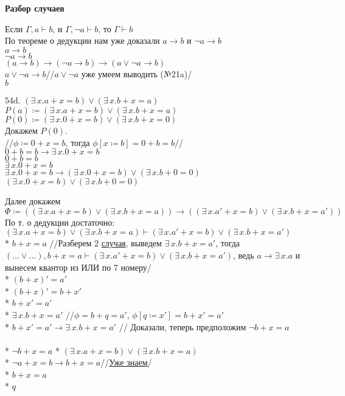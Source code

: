 \documentclass[12pt]{article}
\begin{document}
\hypertarget{cases}{{\bf Разбор случаев}}

Если $\Gamma,a\vdash b$, и $\Gamma,\neg a\vdash b$, то $\Gamma\vdash b$\\
По теореме о дедукции нам уже доказали $a\to b$ и $\neg a\to b$\\
$a\to b$\\
$\neg a\to b$\\
$(a\to b)\to(\neg a\to b)\to(a\vee\neg a\to b)$\\
$a\vee\neg a\to b$//$a\vee\neg a$ уже умеем выводить (№21a)/\\
$b$

54d. $(\exists\,x.a+x=b)\vee(\exists\,x.b+x=a)$\\
$P(a)\coloneqq(\exists\,x.a+x=b)\vee(\exists\,x.b+x=a)$\\
$P(0)\coloneqq(\exists\,x.0+x=b)\vee(\exists\,x.b+x=0)$\\
Докажем $P(0)$.\\
//$\phi\coloneqq 0+x=b$, тогда $\phi[x\coloneqq b]=0+b=b$//\\
$0+b=b\to\exists\,x.0+x=b$\\
$0+b=b$\\
$\exists\,x.0+x=b$\\
$\exists\,x.0+x=b\to(\exists\,x.0+x=b)\vee(\exists\,x.b+0=0)$\\
$(\exists\,x.0+x=b)\vee(\exists\,x.b+0=0)$

Далее докажем $\Phi\coloneqq((\exists\,x.a+x=b)\vee(\exists\,x.b+x=a))\to((\exists\,x.a'+x=b)\vee(\exists\,x.b+x=a'))$\\
По т. о дедукции достаточно: $(\exists\,x.a+x=b)\vee(\exists\,x.b+x=a)\vdash (\exists\,x.a'+x=b)\vee(\exists\,x.b+x=a')$\\
* $b+x=a$ //Разберем 2 \hyperlink{cases}{случая}, выведем $\exists\,x.b+x=a'$, тогда $(\ldots\vee\ldots), b+x=a\vdash (\exists\,x.a'+x=b)\vee(\exists\,x.b+x=a')$, ведь $a\to\exists\,x.a$ и вынесем квантор из ИЛИ по 7 номеру/\\
* $(b+x)'=a'$\\
* $(b+x)'=b+x'$\\
* $b+x'=a'$\\
* $\exists\,x.b+x=a'$ //$\phi=b+q=a'$, $\phi[q\coloneqq x']=b+x'=a'$\\
* $b+x'=a'\to\exists\,x.b+x=a'$ // Доказали, теперь предположим $\neg b+x=a$\\
\\
* $\neg b+x=a$
* $(\exists\,x.a+x=b)\vee(\exists\,x.b+x=a)$\\
* $\neg a+x=b\to b+x=a$//\hyperlink{impToOr}{Уже знаем}/\\
* $b+x=a$\\
* $q$
\end{document}
